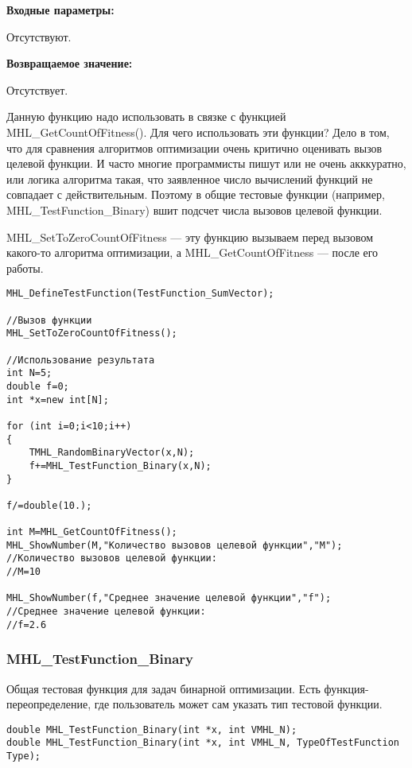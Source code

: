 \documentclass[a4paper,12pt]{article}
\begin{document}
\textbf{Входные параметры:}

Отсутствуют.

\textbf{Возвращаемое значение:}
 
Отсутствует.

Данную функцию надо использовать в связке с функцией MHL\_GetCountOfFitness(). Для чего использовать эти функции? Дело в том, что для сравнения алгоритмов оптимизации очень критично оценивать вызов целевой функции. И часто многие программисты пишут или не очень акккуратно, или логика алгоритма такая, что заявленное число вычислений функций не совпадает с действительным. Поэтому в общие тестовые функции (например, MHL\_TestFunction\_Binary) вшит подсчет числа вызовов целевой функции.

MHL\_SetToZeroCountOfFitness --- эту функцию вызываем перед вызовом какого-то алгоритма оптимизации, а MHL\_GetCountOfFitness --- после его работы.


\begin{lstlisting}[label=code_use_MHL_SetToZeroCountOfFitness,caption=Пример использования]
MHL_DefineTestFunction(TestFunction_SumVector);

//Вызов функции
MHL_SetToZeroCountOfFitness();

//Использование результата
int N=5;
double f=0;
int *x=new int[N];

for (int i=0;i<10;i++)
{
    TMHL_RandomBinaryVector(x,N);
    f+=MHL_TestFunction_Binary(x,N);
}

f/=double(10.);

int M=MHL_GetCountOfFitness();
MHL_ShowNumber(M,"Количество вызовов целевой функции","M");
//Количество вызовов целевой функции:
//M=10

MHL_ShowNumber(f,"Среднее значение целевой функции","f");
//Среднее значение целевой функции:
//f=2.6
\end{lstlisting}

\subsubsection{MHL\_TestFunction\_Binary}\label{MHL_TestFunction_Binary}

Общая тестовая функция для задач бинарной оптимизации. Есть функция-переопределение, где пользователь может сам указать тип тестовой функции.


\begin{lstlisting}[label=code_syntax_MHL_TestFunction_Binary,caption=Синтаксис]
double MHL_TestFunction_Binary(int *x, int VMHL_N);
double MHL_TestFunction_Binary(int *x, int VMHL_N, TypeOfTestFunction Type);
\end{lstlisting}
\end{document}
